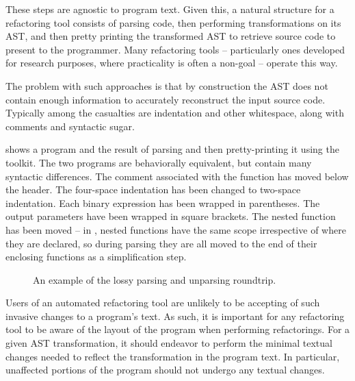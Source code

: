 These steps are agnostic to program text. Given this, a natural structure for a
refactoring tool consists of parsing code, then performing transformations on
its AST, and then pretty printing the transformed AST to retrieve source code
to present to the programmer. Many refactoring tools -- particularly ones
developed for research purposes, where practicality is often a non-goal --
operate this way.

The problem with such approaches is that by construction the AST does not
contain enough information to accurately reconstruct the input source code.
Typically among the casualties are indentation and other whitespace, along
with comments and syntactic sugar.

 shows a \matlab program and the result of parsing and
then pretty-printing it using the \mclab toolkit. The two programs are
behaviorally equivalent, but contain many syntactic differences. The comment
associated with the  function has moved below the header. The
four-space indentation has been changed to two-space indentation. Each binary
expression has been wrapped in parentheses. The output parameters have been
wrapped in square brackets. The nested function  has been moved
-- in \matlab, nested functions have the same scope irrespective of where they
are declared, so during parsing they are all moved to the end of their enclosing
functions as a simplification step.

\begin{figure}
\begin{minipage}{0.5\linewidth}

\end{minipage}
\hfill \hspace{.3cm} \hfill
\begin{minipage}{0.5\linewidth}

\end{minipage}
\caption{An example of the lossy parsing and unparsing roundtrip.}
\label{Fig:LostLayout}
\end{figure}

Users of an automated refactoring tool are unlikely to be accepting of such
invasive changes to a program's text. As such, it is important for any
refactoring tool to be aware of the layout of the program when performing
refactorings. For a given AST transformation, it should endeavor to perform the
minimal textual changes needed to reflect the transformation in the program
text. In particular, unaffected portions of the program should not undergo any
textual changes.

